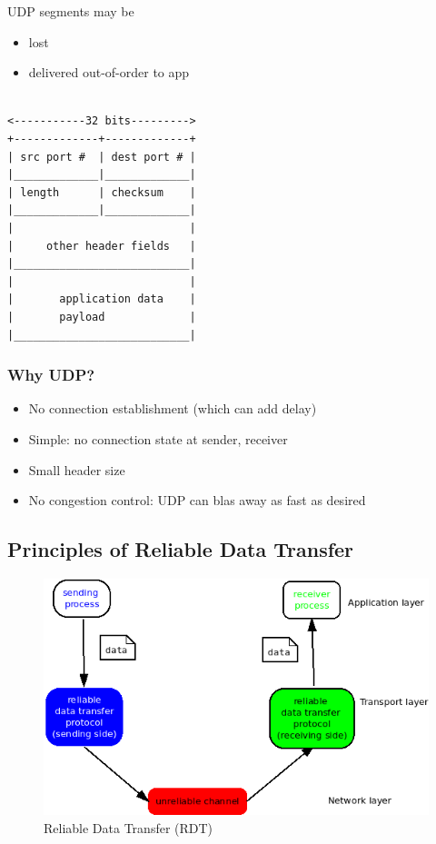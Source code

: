 \documentclass[11pt]{article}
\begin{document}
UDP segments may be
\begin{itemize}
\item lost
\item delivered out-of-order to app
\end{itemize}


\begin{verbatim}

<-----------32 bits--------->
+-------------+-------------+
| src port #  | dest port # |
|_____________|_____________|
| length      | checksum    |
|_____________|_____________|
|                           |
|     other header fields   |
|___________________________|
|                           |
|       application data    |   
|       payload             |
|___________________________|

\end{verbatim}

\subsubsection{Why UDP?}
\label{sec:org827250a}
\begin{itemize}
\item No connection establishment (which can add delay)
\item Simple: no connection state at sender, receiver
\item Small header size
\item No congestion control: UDP can blas away as fast as desired
\end{itemize}

\subsection{Principles of Reliable Data Transfer}
\label{sec:orgfe99c1a}

\begin{figure}[htbp]
\centering
\includegraphics[width=.9\linewidth]{../img/RDT.png}
\caption{Reliable Data Transfer (RDT)}
\end{figure}
\end{document}
